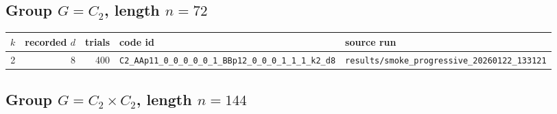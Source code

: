 \documentclass[11pt]{article}
\begin{document}
\subsection{Group $G = C_{2}$, length $n=72$}

\begin{longtable}{@{}r r r l l@{}}
\toprule
$k$ & recorded $d$ & trials & code id & source run \\
\midrule
\endhead
2 & 8 & 400 & \texttt{C2\_AAp11\_0\_0\_0\_0\_0\_1\_BBp12\_0\_0\_0\_1\_1\_1\_k2\_d8} & \texttt{results/smoke\_progressive\_20260122\_133121} \\
\bottomrule
\end{longtable}

\subsection{Group $G = C_{2} \times C_{2}$, length $n=144$}
\end{document}
